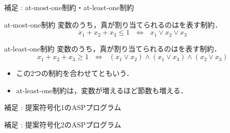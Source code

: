 \documentclass[dvipdfmx,11pt]{beamer}
\begin{document}
\begin{frame}{補足 : at-most-one制約・at-least-one制約}
 
 \begin{block}{at-most-one制約}
  変数のうち，真が割り当てられるのはを表す制約．
  \[
  x_1 + x_2 + x_3 \leq 1 ~~~ \Leftrightarrow ~~~ x_1 \lor x_2 \lor x_3
  \]
 \end{block}

 \begin{block}{at-least-one制約}
  変数のうち，真が割り当てられるのはを表す制約．
  \[
  x_1 + x_2 + x_3 \ge 1 ~~~ \Leftrightarrow ~~~ 
  (x_1 \lor x_2) \land (x_1 \lor x_3) \land (x_2 \lor x_3) 
  \]
 \end{block}

 \begin{itemize}
  \item この2つの制約を合わせてともいう．
  \item at-least-one制約は，変数が増えるほど節数も増える．
 \end{itemize}

\end{frame}


\begin{frame}[fragile]{補足 : 提案符号化1のASPプログラム}
 \begin{exampleblock}{}
  \begin{center}
   
  \end{center}
 \end{exampleblock}
\end{frame}

\begin{frame}[fragile]{補足 : 提案符号化2のASPプログラム}

 \begin{exampleblock}{}
  \begin{center}
   
  \end{center}
 \end{exampleblock}

\end{frame}
\end{document}
